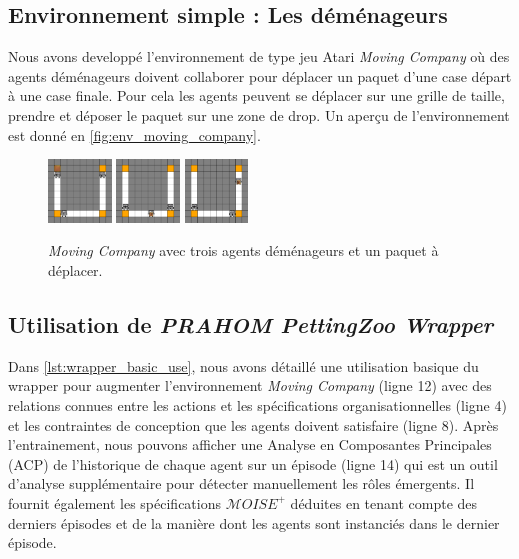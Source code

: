\documentclass[demonstration]{jfsma}
\newcounter{relation}
\begin{document}
\subsection{Environnement simple : Les déménageurs}

Nous avons developpé l'environnement de type jeu Atari \emph{Moving Company} où des agents déménageurs doivent collaborer pour déplacer un paquet d'une case départ à une case finale. Pour cela les agents peuvent se déplacer sur une grille de taille, prendre et déposer le paquet sur une zone de drop. Un aperçu de l'environnement est donné en \autoref{fig:env_moving_company}.

\begin{figure}[h!]
  \centering
  \includegraphics[width=0.15\textwidth]{figures/moving_company_1.png}
  \includegraphics[width=0.15\textwidth]{figures/moving_company_2.png}
  \includegraphics[width=0.15\textwidth]{figures/moving_company_3.png}
  \caption{\emph{Moving Company} avec trois agents déménageurs et un paquet à déplacer.}
  \label{fig:env_moving_company}
\end{figure}

\subsection{Utilisation de \emph{PRAHOM PettingZoo Wrapper}}

Dans \autoref{lst:wrapper_basic_use}, nous avons détaillé une utilisation basique du wrapper pour augmenter l'environnement \emph{Moving Company} (ligne 12) avec des relations connues entre les actions et les spécifications organisationnelles (ligne 4) et les contraintes de conception que les agents doivent satisfaire (ligne 8). Après l'entrainement, nous pouvons afficher une Analyse en Composantes Principales (ACP) de l'historique de chaque agent sur un épisode (ligne 14) qui est un outil d'analyse supplémentaire pour détecter manuellement les rôles émergents. Il fournit également les spécifications $\mathcal{M}OISE^+$ déduites en tenant compte des derniers épisodes et de la manière dont les agents sont instanciés dans le dernier épisode.
\end{document}
